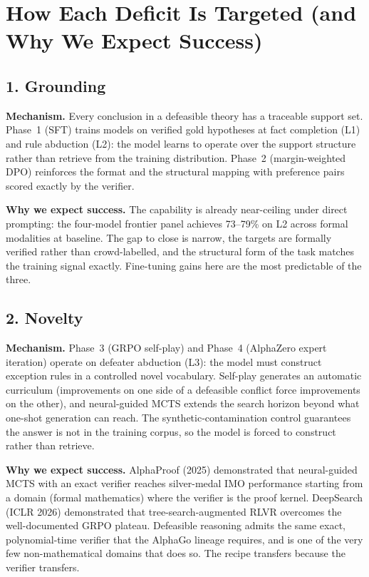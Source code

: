 \documentclass[11pt]{article}
\begin{document}
\section*{How Each Deficit Is Targeted (and Why We Expect Success)}

\subsection*{1. Grounding}

\textbf{Mechanism.} Every conclusion in a defeasible theory has a traceable support set. Phase~1 (SFT) trains models on verified gold hypotheses at fact completion (L1) and rule abduction (L2): the model learns to operate over the support structure rather than retrieve from the training distribution. Phase~2 (margin-weighted DPO) reinforces the format and the structural mapping with preference pairs scored exactly by the verifier.

\textbf{Why we expect success.} The capability is already near-ceiling under direct prompting: the four-model frontier panel achieves 73--79\% on L2 across formal modalities at baseline. The gap to close is narrow, the targets are formally verified rather than crowd-labelled, and the structural form of the task matches the training signal exactly. Fine-tuning gains here are the most predictable of the three.

\subsection*{2. Novelty}

\textbf{Mechanism.} Phase~3 (GRPO self-play) and Phase~4 (AlphaZero expert iteration) operate on defeater abduction (L3): the model must construct exception rules in a controlled novel vocabulary. Self-play generates an automatic curriculum (improvements on one side of a defeasible conflict force improvements on the other), and neural-guided MCTS extends the search horizon beyond what one-shot generation can reach. The synthetic-contamination control guarantees the answer is not in the training corpus, so the model is forced to construct rather than retrieve.

\textbf{Why we expect success.} AlphaProof (2025) demonstrated that neural-guided MCTS with an exact verifier reaches silver-medal IMO performance starting from a domain (formal mathematics) where the verifier is the proof kernel. DeepSearch (ICLR 2026) demonstrated that tree-search-augmented RLVR overcomes the well-documented GRPO plateau. Defeasible reasoning admits the same exact, polynomial-time verifier that the AlphaGo lineage requires, and is one of the very few non-mathematical domains that does so. The recipe transfers because the verifier transfers.
\end{document}
